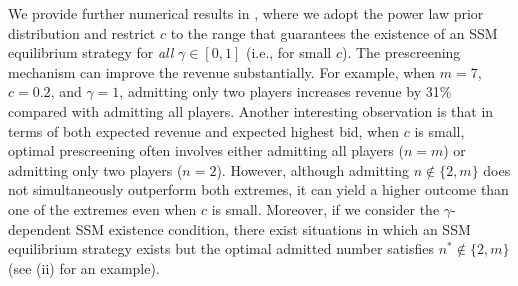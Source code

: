 We provide further numerical results in , where we adopt the power law prior distribution and restrict $c$ to the range that guarantees the existence of an SSM equilibrium strategy for \textit{all} $\gamma\in[0,1]$ (i.e., for small $c$). The prescreening mechanism can improve the revenue substantially. For example, when $m=7$, $c=0.2$, and $\gamma=1$, admitting only two players increases revenue by 31\% compared with admitting all players. 
Another interesting observation is that in terms of both expected revenue and expected highest bid, when $c$ is small, optimal prescreening often involves either admitting all players ($n=m$) or admitting only two players ($n=2$). However, although admitting $n\notin\{2,m\}$ does not simultaneously outperform both extremes, it can yield a higher outcome than one of the extremes even when $c$ is small. Moreover, if we consider the $\gamma$-dependent SSM existence condition, there exist situations in which an SSM equilibrium strategy exists but the optimal admitted number satisfies $n^\ast\notin \{2,m\}$ (see  (ii) for an example).





